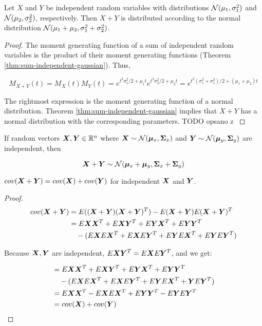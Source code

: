 \begin{thm}
    Let $X$ and $Y$ be independent random variables with distributions ${\mathcal{N}}(\mu_1, \sigma_1^2)$ and ${\mathcal{N}}(\mu_2, \sigma_2^2)$, respectively. Then $X + Y$ is distributed according to the normal distribution ${\mathcal{N}}(\mu_1 + \mu_2, \sigma_1^2 + \sigma_2^2)$.
    
    \begin{proof}
    The moment generating function of a sum of independent random variables is the product of their moment generating functions (Theorem \ref{thm:sum-independent-gaussian}). Thus,
    
    \begin{equation}
    M_{X + Y}(t) = M_X(t) M_Y(t) = e^{t^2 \sigma_1^2 / 2 + \mu_1 t} e^{t^2 \sigma_2^2 / 2 + \mu_2 t} = e^{t^2 (\sigma_1^2 + \sigma_1^2) / 2 + (\mu_1 + \mu_2) t}
    \end{equation}
    
    The rightmost expression is the moment generating function of a normal distribution. Theorem \ref{thm:sum-independent-gaussian} implies that $X + Y$ has a normal distribution with the corresponding parameters. {TODO opsano z \citep{mitzenmacher2017probability}}
    \end{proof}
\end{thm}

\begin{thm}
    If random vectors ${\bm{X}}, {\bm{Y}} \in {\mathbb{R}}^n$ where ${\bm{X}} \sim {\mathcal{N}}({\bm{\mu}}_x, {\bm{\Sigma}}_x)$ and ${\bm{Y}} \sim {\mathcal{N}}({\bm{\mu}}_y, {\bm{\Sigma}}_y)$ are independent, then
    
    \begin{equation}
        {\bm{X}} + {\bm{Y}} \sim {\mathcal{N}}({\bm{\mu}}_x + {\bm{\mu}}_y, {\bm{\Sigma}}_x + {\bm{\Sigma}}_y)
    \end{equation}
\end{thm}

\begin{thm}
    $cov({\bm{X}} + {\bm{Y}}) = cov({\bm{X}}) + cov({\bm{Y}})$ for independent ${\bm{X}}$ and ${\bm{Y}}$.

    \begin{proof}
    \begin{align}
        cov({\bm{X}} + {\bm{Y}}) &= E(({\bm{X}} + {\bm{Y}}) ({\bm{X}} + {\bm{Y}})^T) - E({\bm{X}} + {\bm{Y}})E({\bm{X}} + {\bm{Y}})^T \\
        &= E{\bm{X}}{\bm{X}}^T + E{\bm{X}}{\bm{Y}}^T + E{\bm{Y}}{\bm{X}}^T + E{\bm{Y}}{\bm{Y}}^T \\
          &\quad - (E{\bm{X}} E{\bm{X}}^T + E{\bm{X}} E{\bm{Y}}^T + E{\bm{Y}} E{\bm{X}}^T + E {\bm{Y}} E{\bm{Y}}^T)
    \end{align}
    
    Because ${\bm{X}}, {\bm{Y}}$ are independent, $E {\bm{X}} {\bm{Y}}^T = E {\bm{X}} E {\bm{Y}}^T$, and we get:
    
    \begin{align}
        &= E{\bm{X}}{\bm{X}}^T + E{\bm{X}} {\bm{Y}}^T + E{\bm{Y}}{\bm{X}}^T + E{\bm{Y}}{\bm{Y}}^T \\
          &\quad - (E{\bm{X}} E{\bm{X}}^T + E{\bm{X}} E{\bm{Y}}^T + E{\bm{Y}} E{\bm{X}}^T + {\bm{Y}} E{\bm{Y}}^T) \\
        &= E{\bm{X}}{\bm{X}}^T - E{\bm{X}} E{\bm{X}}^T + E{\bm{Y}} {\bm{Y}}^T - E{\bm{Y}} E{\bm{Y}}^T \\
        &= cov({\bm{X}}) + cov({\bm{Y}})
    \end{align}
    \end{proof}
\end{thm}
    

